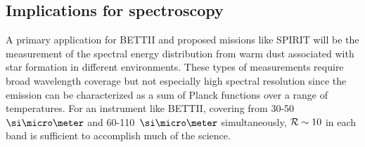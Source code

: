 
\subsection{Implications for spectroscopy}
A primary application for BETTII and proposed missions like SPIRIT will be the measurement of the spectral energy distribution
from warm dust associated with star formation in different environments. These types of measurements require broad wavelength
coverage but not especially high spectral resolution since the emission can be characterized as a sum of Planck functions over
a range of temperatures. For an instrument like BETTII, covering from 30-50~$\um$ and 60-110~$\um$ simultaneously,
$\mathcal{R}\sim 10$ in each band is sufficient to accomplish much of the science.

